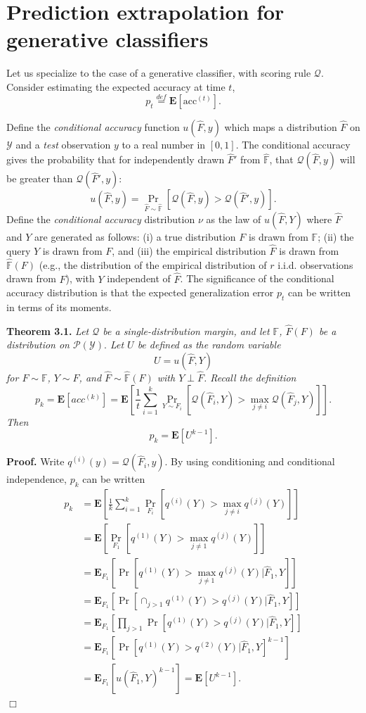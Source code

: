 \documentclass{article}
\newcommand{\E}{\textbf{E}}
\begin{document}
\section{Prediction extrapolation for generative classifiers}

Let us specialize to the case of a generative classifier, with scoring rule $\mathcal{Q}$.
Consider estimating the expected accuracy at time $t$, \[p_t
\stackrel{def}{=} \E[\text{acc}^{(t)}].\]

Define the \emph{conditional accuracy} function $u(\hat{F}, y)$ which maps a
distribution $\hat{F}$ on $\mathcal{Y}$ and a \emph{test} observation $y$ to
a real number in $[0,1]$.  The conditional accuracy gives the
probability that for independently drawn $\hat{F}'$ from $\hat{\mathbb{F}}$, that
$\mathcal{Q}(\hat{F}, y)$ will be greater than $\mathcal{Q}(\hat{F}', y)$:
\[
u(\hat{F}, y) = \Pr_{\hat{F} \sim \hat{\mathbb{F}}}[\mathcal{Q}(\hat{F}, y) > \mathcal{Q}(\hat{F}', y)].
\]
Define the \emph{conditional accuracy} distribution $\nu$ as the law
of $u(\hat{F}, Y)$ where $\hat{F}$ and $Y$ are generated as follows:
(i) a true distribution $F$ is drawn from $\mathbb{F}$; (ii) the query $Y$ is drawn from $F$, 
and (iii) the empirical distribution $\hat{F}$ is drawn from $\hat{\mathbb{F}}(F)$ 
(e.g., the distribution of the empirical distribution of $r$ i.i.d. observations drawn from $F$),
with $Y$ independent of $\hat{F}$.  The significance of the conditional accuracy
distribution is that the expected generalization error $p_t$ can be
written in terms of its moments.

\noindent\textbf{Theorem 3.1.} \emph{
Let $\mathcal{Q}$ be a single-distribution margin, and let $\mathbb{F}$, $\hat{F}(F)$ be a distribution on $\mathcal{P}(\mathcal{Y}).$
Let $U$ be defined as the random variable
\[
U = u(\hat{F}, Y)
\]
for $F \sim \mathbb{F}$, $Y \sim F$, and $\hat{F} \sim \hat{\mathbb{F}}(F)$ with $Y \perp \hat{F}$.
Recall the definition
\[
p_k = \E[acc^{(k)}] = \E\left[\frac{1}{t}\sum_{i=1}^k \Pr_{Y \sim F_i}[\mathcal{Q}(\hat{F}_i, Y) > \max_{j \neq i}\mathcal{Q}(\hat{F}_j, Y)]\right].
\]
Then \[p_k = \E[U^{k-1}].\]
}

\noindent\textbf{Proof.}  
Write $q^{(i)}(y) = \mathcal{Q}(\hat{F}_i, y)$.
By using conditioning and
conditional independence, $p_k$ can be written
\begin{align*}
p_k &= \E\left[ \frac{1}{k}\sum_{i=1}^k  \Pr_{F_i}[q^{(i)}(Y) > \max_{j\neq i} q^{(j)}(Y)] \right]
\\&= \E\left[ \Pr_{F_1}[q^{(1)}(Y) > \max_{j\neq 1} q^{(j)}(Y)] \right]
\\&= \E_{F_1}[\Pr[q^{(1)}(Y) > \max_{j\neq 1} q^{(j)}(Y)|\hat{F}_1, Y]]
\\&= \E_{F_1}[\Pr[\cap_{j > 1} q^{(1)}(Y) > q^{(j)}(Y)|\hat{F}_1, Y]]
\\&= \E_{F_1}[\prod_{j > 1}\Pr[q^{(1)}(Y) > q^{(j)}(Y)|\hat{F}_1, Y]]
\\&= \E_{F_1}[\Pr[q^{(1)}(Y) > q^{(2)}(Y)|\hat{F}_1, Y]^{k-1}]
\\&= \E_{F_1}[u(\hat{F}_1, Y)^{k-1}] = \E[U^{k-1}].
\end{align*}
$\Box$
\end{document}
